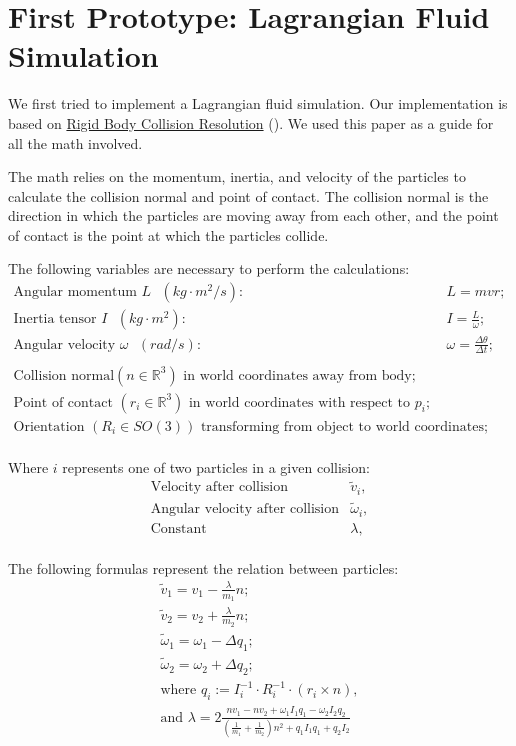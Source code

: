 \documentclass[a4paper,12pt,titlepage]{article}
\begin{document}
\pagebreak
\section{First Prototype: Lagrangian Fluid Simulation}
We first tried to implement a Lagrangian fluid simulation.
Our implementation is based on \hyperlink{http://www.hakenberg.de/diffgeo/collision_resolution.htm}{Rigid Body Collision Resolution}
(\cite{hakenberg}). We used this paper as a guide for all the math involved.

The math relies on the momentum, inertia, and velocity of the particles to
calculate the collision normal and point of contact. The collision normal is
the direction in which the particles are moving away from each other, and the
point of contact is the point at which the particles collide.

The following variables are necessary to perform the calculations:
\[
\begin{array}{ll}
	\text{Angular momentum $L$ } (kg\cdot m^2/s): & L = mvr; \\
	\text{Inertia tensor $I$ } (kg\cdot m^2): & I = \frac{L}{\omega}; \\
    \text{Angular velocity $\omega$ } (rad/s): & \omega = \frac{\Delta \theta}{\Delta t}; \\

	\\

	\text{Collision normal} (n \in \mathbb{R}^3) \text{ in world coordinates away from body}; \\
	\text{Point of contact } (r_i \in \mathbb{R}^3) \text{ in world coordinates with respect to $p_i$}; \\
	\text{Orientation } (R_i \in SO(3)) \text{ transforming from object to world coordinates}; \\
\end{array}
\]

Where $i$ represents one of two particles in a given collision:
\[
\begin{array}{ll}
	\text{Velocity after collision} & \tilde{v}_i, \\ 
	\text{Angular velocity after collision} & \tilde{\omega}_i, \\
	\text{Constant} & \lambda, \\
\end{array}
\]

The following formulas represent the relation between particles:
\[
\begin{array}{cc}
	\tilde{v}_1 = v_1 - \frac{\lambda}{m_1} n; \\ 
	\tilde{v}_2 = v_2 + \frac{\lambda}{m_2} n; \\
	\tilde{\omega}_1 = \omega_1 - \Delta q_1; \\
	\tilde{\omega}_2 = \omega_2 + \Delta q_2; \\

	\text{where } q_i := I_i^{-1} \cdot R_i^{-1} \cdot (r_i\times n), \\
	\text{and } \lambda = 2 \frac{n v_1 - n v_2 + \omega_1 I_1 q_1 - \omega_2 I_2 q_2}
	{(\frac{1}{m_1} + \frac{1}{m_2})n^2 + q_1 I_1 q_1 + q_2 I_2} \\
\end{array}
\]
\end{document}
